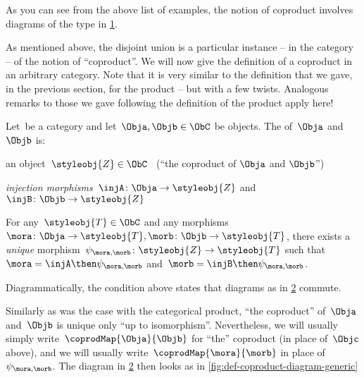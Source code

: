 As you can see from the above list of examples, the notion of coproduct involves diagrams of the type in \cref{fig:coprod_generic}.

\begin{figure}[h!]
    \centering
    \caption{}
    \label{fig:coprod_generic}
\end{figure}


As mentioned above, the disjoint union is a particular instance -- in the category \Set  -- of the notion of ``coproduct''.
We will now give the definition of a coproduct in an arbitrary category. Note that it is very similar to the definition that we gave, in the previous section, for the product -- but with a few twists. Analogous remarks to those we gave following the definition of the product apply here!

\begin{ctdefinition}[Coproduct]
    \label{def:catcoproduct}
    Let~\CatC be a category and let~$\Obja, \Objb \in \ObC$ be objects.
    The \emph{} of~$\Obja$ and~$\Objb$ is:  \\
    \constit
    \begin{compactenum}
        \item an object~$\styleobj{Z} \in \ObC$ \ (``the coproduct of $\Obja$ and $\Objb$'')
        \item \emph{injection morphisms}~$\injA \colon \Obja \to \styleobj{Z} $ and~$\injB \colon \Objb \to \styleobj{Z} $
    \end{compactenum}
    \condit
    \begin{compactenum}
        \item For any~$\styleobj{T} \in \ObC$ and any morphisms~$\mora \colon  \Obja \to \styleobj{T}, \morb \colon \Objb \to \styleobj{T}$, there exists a \emph{unique} morphism~$\psi_{\mora, \morb} \colon \styleobj{Z} \to \styleobj{T}$ such that~$\mora = \injA\then \psi_{\mora, \morb}$ and~$\morb = \injB \then \psi_{\mora,\morb}$.
    \end{compactenum}
\end{ctdefinition}


\begin{remark}
    Diagrammatically, the condition above states that diagrams as in \cref{fig:coprod_general_1} commute.
    \begin{figure}[h!]
        \centering
        \caption{}
        \label{fig:coprod_general_1}
    \end{figure}
    \label{fig:def-coproduct-diagram}
    Similarly as was the case with the categorical product, ``the coproduct'' of~$\Obja$ and~$\Objb$ is unique only ``up to isomorphism''.
    Nevertheless, we will usually simply write~$\coprodMap{\Obja}{\Objb}$ for ``the'' coproduct (in place of~$\Objc$ above), and we will usually write~$\coprodMap{\mora}{\morb}$ in place of~$\psi_{\mora, \morb}$.
    The diagram in \cref{fig:coprod_general_1} then looks as in \cref{fig:def-coproduct-diagram-generic}
\end{remark}

